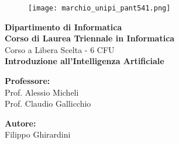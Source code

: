 \begin{titlepage} %
	\begin{figure}[t] %
		\centering\texttt{[image: marchio\_unipi\_pant541.png]}
	\end{figure}
	\vspace{20mm}
	
	\begin{Large}
		\begin{center}
			\textbf{Dipartimento di Informatica\\ Corso di Laurea Triennale in Informatica\\}
			\vspace{20mm}
			{\LARGE{Corso a Libera Scelta - 6 CFU}}\\
			\vspace{10mm}
			{\huge{\bf Introduzione all'Intelligenza Artificiale}}\\
		\end{center}
	\end{Large}
	
	
	\vspace{36mm}
	\begin{minipage}[t]{0.47\textwidth}
		{\large{\bf Professore:}\\ \large{Prof. Alessio Micheli\\ Prof. Claudio Gallicchio }}
	\end{minipage}
	\hfill
	\begin{minipage}[t]{0.47\textwidth}\raggedleft
		{\large{\bf Autore:}\\ \large{Filippo Ghirardini}}
	\end{minipage}
	
	\vspace{25mm}
	
	\hrulefill
	
	\vspace{5mm}
	
	
\end{titlepage}